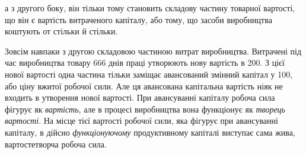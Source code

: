\parcont{}  %
а з другого боку, він тільки тому становить складову частину
товарної вартості, що він є вартість витраченого капіталу, або
тому, що засоби виробництва коштують от стільки й стільки.

Зовсім навпаки з другою складовою частиною витрат виробництва.
Витрачені під час виробництва товару 666 днів
праці утворюють нову вартість в 200. З цієї
нової вартості одна частина тільки заміщає авансований змінний
капітал у 100, або ціну вжитої робочої сили.
Але ця авансована капітальна вартість ніяк не входить в утворення
нової вартості. При авансуванні капіталу робоча сила
фігурує як \emph{вартість}, але в процесі виробництва вона функціонує
як \emph{творець вартості}. На місце тієї вартості робочої сили,
яка фігурує при авансуванні капіталу, в дійсно \emph{функціонуючому}
продуктивному капіталі виступає сама жива, вартостетворча робоча
сила.

